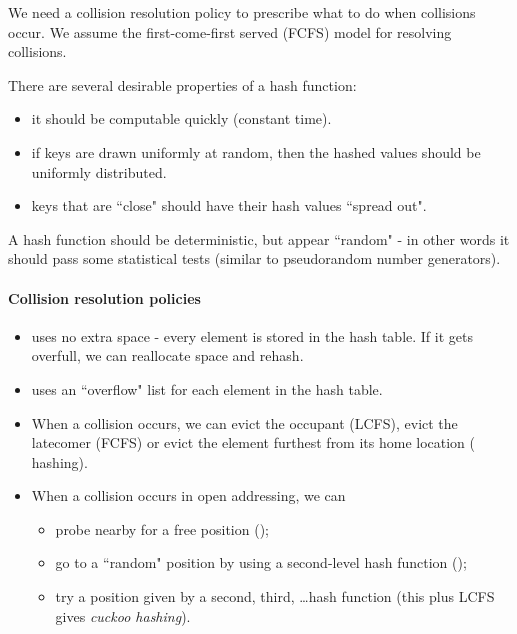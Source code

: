 We need a collision resolution policy to prescribe what to do when 
collisions occur. We assume the first-come-first served (FCFS) model for resolving
collisions.

There are several desirable properties of a hash function:
\begin{itemize}
\item it should be computable quickly (constant time).
\item if keys are drawn uniformly at random, then the hashed values
should be uniformly distributed. 
\item keys that are ``close" should have their hash values ``spread out". 
\end{itemize}
A hash function should be deterministic, but appear ``random" - in other 
words it should pass some statistical tests (similar to pseudorandom number generators). 

\paragraph{Collision resolution policies}
\begin{itemize}
\item {} uses no extra space - every element is stored in 
the hash table. If it gets overfull, we can reallocate space and 
{rehash}.
\item  {} uses an ``overflow" list for each element in 
the hash table.
\item When a collision occurs, we can evict the occupant (LCFS), 
evict the latecomer (FCFS) or evict the element furthest from its home location
 ( hashing).
\item When a collision occurs in open addressing, we can 
	\begin{itemize}
		\item probe nearby for a free position 
		();
		\item go to a ``random" position by using a second-level hash function 
		();
		\item try a position given by a second, third, \dots hash function (this plus 
		LCFS gives \emph{cuckoo hashing}). 
	\end{itemize}
\end{itemize}



